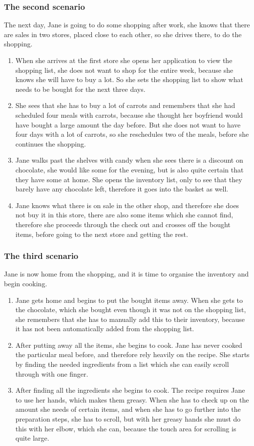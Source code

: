 \subsubsection{The second scenario}
The next day, Jane is going to do some shopping after work, she knows that there are sales in two stores, placed close to each other, so she drives there, to do the shopping.
\begin{enumerate}
  \item When she arrives at the first store she opens her application to view the shopping list, she does not want to shop for the entire week, because she knows she will have to buy a lot. So she sets the shopping list to show what needs to be bought for the next three days.
  \item She sees that she has to buy a lot of carrots and remembers that she had scheduled four meals with carrots, because she thought her boyfriend would have bought a large amount the day before. But she does not want to have four days with a lot of carrots, so she reschedules two of the meals, before she continues the shopping.
  \item Jane walks past the shelves with candy when she sees there is a discount on chocolate, she would like some for the evening, but is also quite certain that they have some at home. She opens the inventory list, only to see that they barely have any chocolate left, therefore it goes into the basket as well.
  \item Jane knows what there is on sale in the other shop, and therefore she does not buy it in this store, there are also some items which she cannot find, therefore she proceeds through the check out and crosses off the bought items, before going to the next store and getting the rest.
\end{enumerate}

\subsubsection{The third scenario}
Jane is now home from the shopping, and it is time to organise the inventory and begin cooking.
\begin{enumerate}
  \item Jane gets home and begins to put the bought items away. When she gets to the chocolate, which she bought even though it was not on the shopping list, she remembers that she has to manually add this to their inventory, because it has not been automatically added from the shopping list.
  \item After putting away all the items, she begins to cook. Jane has never cooked the particular meal before, and therefore rely heavily on the recipe. She starts by finding the needed ingredients from a list which she can easily scroll through with one finger.
  \item After finding all the ingredients she begins to cook. The recipe requires Jane to use her hands, which makes them greasy. When she has to check up on the amount she needs of certain items, and when she has to go further into the preparation steps, she has to scroll, but with her greasy hands she must do this with her elbow, which she can, because the touch area for scrolling is quite large. 
\end{enumerate}
